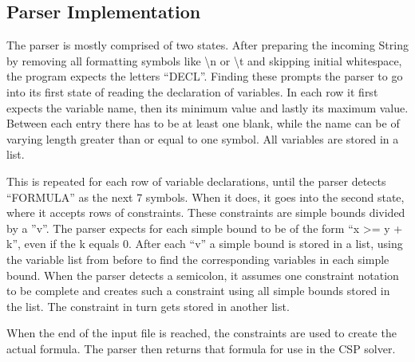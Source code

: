 
\subsection{Parser Implementation}\label{ssec:parser-impl}

The parser is mostly comprised of two states. After preparing the incoming String by removing all formatting symbols like \textbackslash n or \textbackslash t and skipping initial whitespace, the program expects the letters ``DECL''. Finding these prompts the parser to go into its first state of reading the declaration of variables. In each row it first expects the variable name, then its minimum value and lastly its maximum value. Between each entry there has to be at least one blank, while the name can be of varying length greater than or equal to one symbol. All variables are stored in a list.

This is repeated for each row of variable declarations, until the parser detects ``FORMULA'' as the next 7 symbols. When it does, it goes into the second state, where it accepts rows of constraints. These constraints are simple bounds divided by a ''v''. The parser expects for each simple bound to be of the form ``x >= y + k'', even if the k equals 0. After each ``v'' a simple bound is stored in a list, using the variable list from before to find the corresponding variables in each simple bound. When the parser detects a semicolon, it assumes one constraint notation to be complete and creates such a constraint using all simple bounds stored in the list. The constraint in turn gets stored in another list.

When the end of the input file is reached, the constraints are used to create the actual formula.
The parser then returns that formula for use in the CSP solver.
